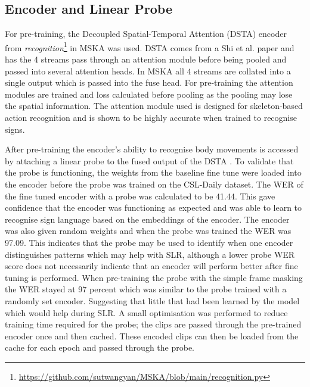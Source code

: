 \documentclass{article}
\begin{document}
\subsection{Encoder and Linear Probe}
For pre-training, the Decoupled Spatial-Temporal Attention (DSTA) encoder from \emph{recognition}\footnote{\url{https://github.com/sutwangyan/MSKA/blob/main/recognition.py}} in MSKA was used. DSTA comes from a Shi et al. paper \cite{shi_decoupled_2020} and has the 4 streams pass through an attention module before being pooled and passed into several attention heads. In MSKA all 4 streams are collated into a single output which is passed into the fuse head. For pre-training the attention modules are trained and loss calculated before pooling as the pooling may lose the spatial information. The attention module used is designed for skeleton-based action recognition and is shown to be highly accurate when trained to recognise signs.

After pre-training the encoder's ability to recognise body movements is accessed by attaching a linear probe to the fused output of the DSTA \cite{alain_understanding_2018} . To validate that the probe is functioning, the weights from the baseline fine tune were loaded into the encoder before the probe was trained on the CSL-Daily dataset. The WER of the fine tuned encoder with a probe was calculated to be 41.44. This gave confidence that the encoder was functioning as expected and was able to learn to recognise sign language based on the embeddings of the encoder. The encoder was also given random weights and when the probe was trained the WER was 97.09. This indicates that the probe may be used to identify when one encoder distinguishes patterns which may help with SLR, although a lower probe WER score does not necessarily indicate that an encoder will perform better after fine tuning is performed. When pre-training the probe with the simple frame masking the WER stayed at 97 percent which was similar to the probe trained with a randomly set encoder. Suggesting that little that had been learned by the model which would help during SLR. A small optimisation was performed to reduce training time required for the probe; the clips are passed through the pre-trained encoder once and then cached. These encoded clips can then be loaded from the cache for each epoch and passed through the probe.
\end{document}
